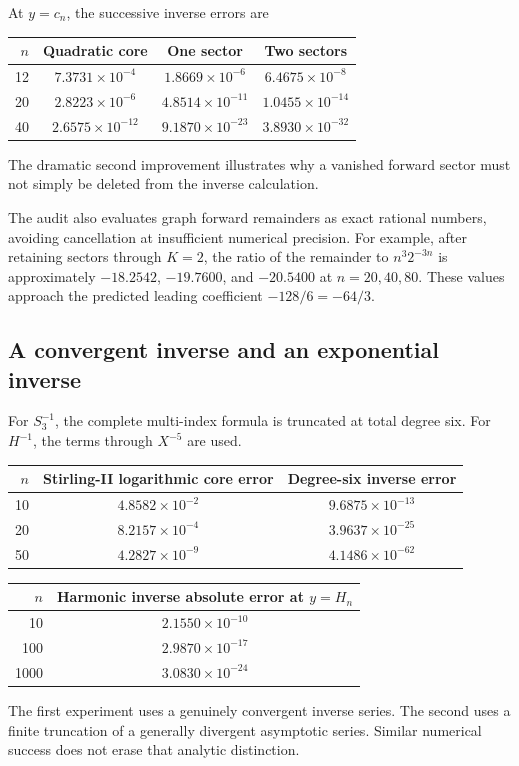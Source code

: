 \documentclass[11pt,a4paper]{article}
\numberwithin{equation}{section}
\theoremstyle{definition}
\theoremstyle{remark}
\begin{document}
At $y=c_n$, the successive inverse errors are
\begin{center}
\begin{tabular}{rccc}
\toprule
$n$ & Quadratic core & One sector & Two sectors\\\midrule
12 & $7.3731\times10^{-4}$ & $1.8669\times10^{-6}$ & $6.4675\times10^{-8}$\\
20 & $2.8223\times10^{-6}$ & $4.8514\times10^{-11}$ & $1.0455\times10^{-14}$\\
40 & $2.6575\times10^{-12}$ & $9.1870\times10^{-23}$ & $3.8930\times10^{-32}$\\\bottomrule
\end{tabular}
\end{center}
The dramatic second improvement illustrates why a vanished forward sector must not simply be deleted from the inverse calculation.

The audit also evaluates graph forward remainders as exact rational numbers, avoiding cancellation at insufficient numerical precision. For example, after retaining sectors through $K=2$, the ratio of the remainder to $n^3 2^{-3n}$ is approximately $-18.2542$, $-19.7600$, and $-20.5400$ at $n=20,40,80$. These values approach the predicted leading coefficient $-128/6=-64/3$.

\subsection{A convergent inverse and an exponential inverse}

For $S_3^{-1}$, the complete multi-index formula is truncated at total degree six. For $H^{-1}$, the terms through $X^{-5}$ are used.
\begin{center}
\begin{tabular}{rcc}
\toprule
$n$ & Stirling-II logarithmic core error & Degree-six inverse error\\\midrule
10 & $4.8582\times10^{-2}$ & $9.6875\times10^{-13}$\\
20 & $8.2157\times10^{-4}$ & $3.9637\times10^{-25}$\\
50 & $4.2827\times10^{-9}$ & $4.1486\times10^{-62}$\\\bottomrule
\end{tabular}
\end{center}
\begin{center}
\begin{tabular}{rc}
\toprule
$n$ & Harmonic inverse absolute error at $y=H_n$\\\midrule
10 & $2.1550\times10^{-10}$\\
100 & $2.9870\times10^{-17}$\\
1000 & $3.0830\times10^{-24}$\\\bottomrule
\end{tabular}
\end{center}
The first experiment uses a genuinely convergent inverse series. The second uses a finite truncation of a generally divergent asymptotic series. Similar numerical success does not erase that analytic distinction.
\end{document}
